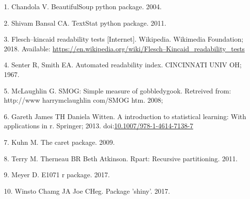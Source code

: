 \documentclass[10pt,letterpaper]{article}
\begin{document}
\hypertarget{refs}{}
\leavevmode\hypertarget{ref-BeautifulSoup}{}%
1. Chandola V. BeautifulSoup python package. 2004.

\leavevmode\hypertarget{ref-textstat}{}%
2. Shivam Bansal CA. TextStat python package. 2011.

\leavevmode\hypertarget{ref-wikipedia_2018}{}%
3. Flesch--kincaid readability tests {[}Internet{]}. Wikipedia.
Wikimedia Foundation; 2018. Available:
\url{https://en.wikipedia.org/wiki/Flesch–Kincaid_readability_tests}

\leavevmode\hypertarget{ref-senter1967automated}{}%
4. Senter R, Smith EA. Automated readability index. CINCINNATI UNIV OH;
1967.

\leavevmode\hypertarget{ref-mclaughlin2008smog}{}%
5. McLaughlin G. SMOG: Simple measure of gobbledygook. Retreived from:
http://www harrymclaughlin com/SMOG htm. 2008;

\leavevmode\hypertarget{ref-MLbook}{}%
6. Gareth James TH Daniela Witten. A introduction to statistical
learning: With applications in r. Springer; 2013.
doi:\href{https://doi.org/10.1007/978-1-4614-7138-7}{10.1007/978-1-4614-7138-7}

\leavevmode\hypertarget{ref-Kuhn09thecaret}{}%
7. Kuhn M. The caret package. 2009.

\leavevmode\hypertarget{ref-rpart}{}%
8. Terry M. Therneau BR Beth Atkinson. Rpart: Recursive partitioning.
2011.

\leavevmode\hypertarget{ref-e1071}{}%
9. Meyer D. E1071 r package. 2017.

\leavevmode\hypertarget{ref-shiny}{}%
10. Winsto Chamg JA Joe CHeg. Package 'shiny'. 2017.

\nolinenumbers
\end{document}
